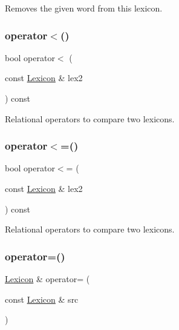 Removes the given word from this lexicon. 

\mbox{\label{classLexicon_aad808851ca0fffc8b60fd0b69ad097bd}} 
\subsubsection{\texorpdfstring{operator$<$()}{operator<()}}
{\footnotesize\ttfamily bool operator$<$ (\begin{DoxyParamCaption}\item[{const \mbox{\hyperlink{classLexicon}{Lexicon}} \&}]{lex2 }\end{DoxyParamCaption}) const}



Relational operators to compare two lexicons. 

\mbox{\label{classLexicon_a236ec3f5ec721fb4ca4551bf49123eac}} 
\subsubsection{\texorpdfstring{operator$<$=()}{operator<=()}}
{\footnotesize\ttfamily bool operator$<$= (\begin{DoxyParamCaption}\item[{const \mbox{\hyperlink{classLexicon}{Lexicon}} \&}]{lex2 }\end{DoxyParamCaption}) const}



Relational operators to compare two lexicons. 

\mbox{\label{classLexicon_ab9766b3af1f48ed51a1bcf037e08de43}} 
\subsubsection{\texorpdfstring{operator=()}{operator=()}}
{\footnotesize\ttfamily \mbox{\hyperlink{classLexicon}{Lexicon}} \& operator= (\begin{DoxyParamCaption}\item[{const \mbox{\hyperlink{classLexicon}{Lexicon}} \&}]{src }\end{DoxyParamCaption})}

